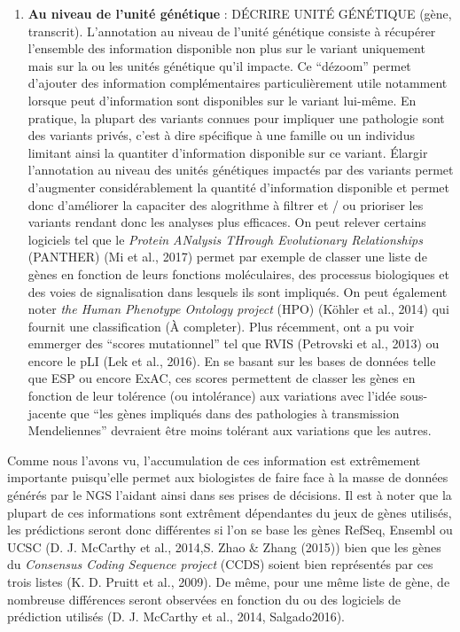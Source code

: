 \documentclass[12pt,twoside]{reedthesis}
\providecommand{\tightlist}{%
  \setlength{\itemsep}{0pt}\setlength{\parskip}{0pt}}
\theoremstyle{definition}
\theoremstyle{definition}
\theoremstyle{remark}
\begin{document}
  \begin{enumerate}
  \def\labelenumi{\arabic{enumi}.}
  \setcounter{enumi}{1}
  \tightlist
  \item
    \textbf{Au niveau de l'unité génétique} : DÉCRIRE UNITÉ GÉNÉTIQUE
    (gène, transcrit). L'annotation au niveau de l'unité génétique
    consiste à récupérer l'ensemble des information disponible non plus
    sur le variant uniquement mais sur la ou les unités génétique qu'il
    impacte. Ce ``dézoom'' permet d'ajouter des information
    complémentaires particulièrement utile notamment lorsque peut
    d'information sont disponibles sur le variant lui-même. En pratique,
    la plupart des variants connues pour impliquer une pathologie sont des
    variants privés, c'est à dire spécifique à une famille ou un individus
    limitant ainsi la quantiter d'information disponible sur ce variant.
    Élargir l'annotation au niveau des unités génétiques impactés par des
    variants permet d'augmenter considérablement la quantité d'information
    disponible et permet donc d'améliorer la capaciter des alogrithme à
    filtrer et / ou prioriser les variants rendant donc les analyses plus
    efficaces. On peut relever certains logiciels tel que le \emph{Protein
    ANalysis THrough Evolutionary Relationships} (PANTHER) (Mi et al.,
    2017) permet par exemple de classer une liste de gènes en fonction de
    leurs fonctions moléculaires, des processus biologiques et des voies
    de signalisation dans lesquels ils sont impliqués. On peut également
    noter \emph{the Human Phenotype Ontology project} (HPO) (Köhler et
    al., 2014) qui fournit une classification (À completer). Plus
    récemment, ont a pu voir emmerger des ``scores mutationnel'' tel que
    RVIS (Petrovski et al., 2013) ou encore le pLI (Lek et al., 2016). En
    se basant sur les bases de données telle que ESP ou encore ExAC, ces
    scores permettent de classer les gènes en fonction de leur tolérence
    (ou intolérance) aux variations avec l'idée sous-jacente que ``les
    gènes impliqués dans des pathologies à transmission Mendeliennes''
    devraient être moins tolérant aux variations que les autres.
  \end{enumerate}
  
  Comme nous l'avons vu, l'accumulation de ces information est extrêmement
  importante puisqu'elle permet aux biologistes de faire face à la masse
  de données générés par le NGS l'aidant ainsi dans ses prises de
  décisions. Il est à noter que la plupart de ces informations sont
  extrêment dépendantes du jeux de gènes utilisés, les prédictions seront
  donc différentes si l'on se base les gènes RefSeq, Ensembl ou UCSC (D.
  J. McCarthy et al., 2014,S. Zhao \& Zhang (2015)) bien que les gènes du
  \emph{Consensus Coding Sequence project} (CCDS) soient bien représentés
  par ces trois listes (K. D. Pruitt et al., 2009). De même, pour une même
  liste de gène, de nombreuse différences seront observées en fonction du
  ou des logiciels de prédiction utilisés (D. J. McCarthy et al., 2014,
  Salgado2016).
  
\end{document}
